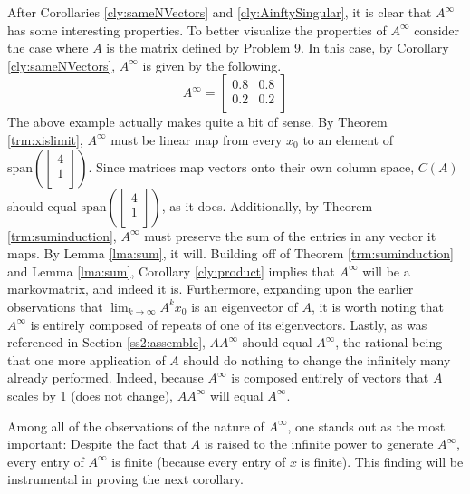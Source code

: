 \documentclass[titlepage]{article}
\newcounter{corollary}
\newcommand{\spn}[1]{\text{span}\left( #1 \right)}
\begin{document}
After Corollaries \ref{cly:sameNVectors} and \ref{cly:AinftySingular}, it is clear that $A^\infty$ has some interesting properties. To better visualize the properties of $A^\infty$ consider the case where $A$ is the matrix defined by Problem 9. In this case, by Corollary \ref{cly:sameNVectors}, $A^\infty$ is given by the following.
\begin{equation*}
    A^\infty =
    \begin{bmatrix}
        0.8 & 0.8\\
        0.2 & 0.2\\
    \end{bmatrix}
\end{equation*}
The above example actually makes quite a bit of sense. By Theorem \ref{trm:xislimit}, $A^\infty$ must be linear map from every $x_0$ to an element of $
    \spn{
        \begin{bmatrix}
            4\\
            1\\
        \end{bmatrix}
    }
$. Since matrices map vectors onto their own column space, $C(A)$ should equal $
\spn{
    \begin{bmatrix}
        4\\
        1\\
    \end{bmatrix}
}
$, as it does. Additionally, by Theorem \ref{trm:suminduction}, $A^\infty$ must preserve the sum of the entries in any vector it maps. By Lemma \ref{lma:sum}, it will. Building off of Theorem \ref{trm:suminduction} and Lemma \ref{lma:sum}, Corollary \ref{cly:product} implies that $A^\infty$ will be a \Gls{markovmatrix}, and indeed it is. Furthermore, expanding upon the earlier observations that $\lim_{k\to\infty}A^kx_0$ is an eigenvector of $A$, it is worth noting that $A^\infty$ is entirely composed of repeats of one of its eigenvectors. Lastly, as was referenced in Section \ref{ss2:assemble}, $AA^\infty$ should equal $A^\infty$, the rational being that one more application of $A$ should do nothing to change the infinitely many already performed. Indeed, because $A^\infty$ is composed entirely of vectors that $A$ scales by 1 (does not change), $AA^\infty$ will equal $A^\infty$.\par
Among all of the observations of the nature of $A^\infty$, one stands out as the most important: Despite the fact that $A$ is raised to the infinite power to generate $A^\infty$, every entry of $A^\infty$ is finite (because every entry of $x$ is finite). This finding will be instrumental in proving the next corollary.\par
\end{document}
